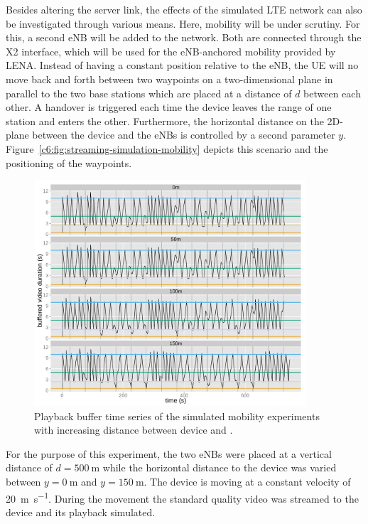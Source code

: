 Besides altering the server link, the effects of the simulated \gls{LTE} network can also be investigated through various means. Here, mobility will be under scrutiny. For this, a second \gls{eNB} will be added to the network. Both are connected through the X2 interface, which will be used for the \gls{eNB}-anchored mobility provided by LENA. Instead of having a constant position relative to the \gls{eNB}, the \gls{UE} will no move back and forth between two waypoints on a two-dimensional plane in parallel to the two base stations which are placed at a distance of $d$ between each other. A handover is triggered each time the device leaves the range of one station and enters the other. Furthermore, the horizontal distance on the 2D-plane between the device and the \glspl{eNB} is controlled by a second parameter $y$. Figure~\ref{c6:fig:streaming-simulation-mobility} depicts this scenario and the positioning of the waypoints.

\begin{figure}[htb]
	\centering
	\includegraphics[width=0.9\textwidth]{images/R-ltesim-plotbuffer-mobility-facets.pdf}
	\caption{Playback buffer time series of the simulated mobility experiments with increasing distance between device and .}
\label{c6:fig:ltesim-mobility-plotbuffer-facets}
\end{figure}

For the purpose of this experiment, the two \glspl{eNB} were placed at a vertical distance of $d=\SI{500}{\meter}$ while the horizontal distance to the device was varied between $y=\SI{0}{\meter}$ and $y=\SI{150}{\meter}$. The device is moving at a constant velocity of \SI{20}{\meter\per\second}. During the movement the standard quality video was streamed to the device and its playback simulated. 

